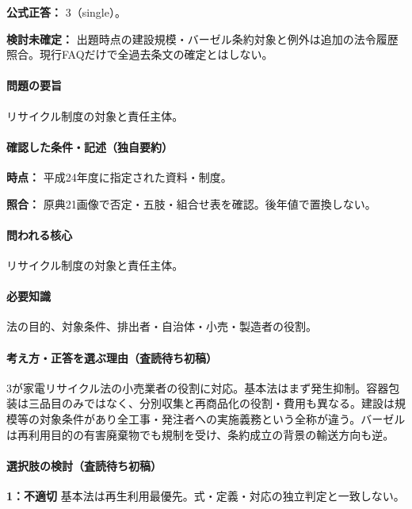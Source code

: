\textbf{公式正答：} 3（single）。

\par\textbf{検討未確定：} 出題時点の建設規模・バーゼル条約対象と例外は追加の法令履歴照合。現行FAQだけで全過去条文の確定とはしない。

\paragraph{問題の要旨} リサイクル制度の対象と責任主体。

\paragraph{確認した条件・記述（独自要約）}\mbox{}\par

\noindent\textbf{時点：} 平成24年度に指定された資料・制度。\par

\noindent\textbf{照合：} 原典21画像で否定・五肢・組合せ表を確認。後年値で置換しない。\par

\paragraph{問われる核心} リサイクル制度の対象と責任主体。

\paragraph{必要知識} 法の目的、対象条件、排出者・自治体・小売・製造者の役割。

\paragraph{考え方・正答を選ぶ理由（査読待ち初稿）} 3が家電リサイクル法の小売業者の役割に対応。基本法はまず発生抑制。容器包装は三品目のみではなく、分別収集と再商品化の役割・費用も異なる。建設は規模等の対象条件があり全工事・発注者への実施義務という全称が違う。バーゼルは再利用目的の有害廃棄物でも規制を受け、条約成立の背景の輸送方向も逆。

\paragraph{選択肢の検討（査読待ち初稿）}\mbox{}\par

\noindent\textbf{1：不適切} 基本法は再生利用最優先。式・定義・対応の独立判定と一致しない。\par

